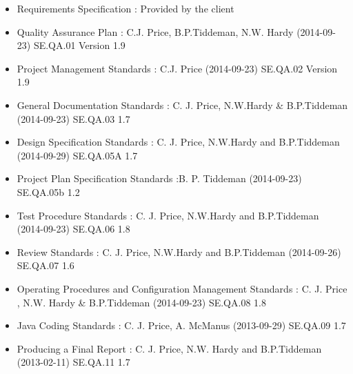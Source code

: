 \begin{itemize}
	\item Requirements Specification : Provided by the client
	\item Quality Assurance Plan : C.J. Price, B.P.Tiddeman, N.W. Hardy (2014-09-23) SE.QA.01 Version 1.9
	\item Project Management Standards : C.J. Price (2014-09-23) SE.QA.02 Version 1.9
	\item General Documentation Standards : C. J. Price, N.W.Hardy \& B.P.Tiddeman (2014-09-23) SE.QA.03 1.7
	\item Design Specification Standards : C. J. Price, N.W.Hardy and B.P.Tiddeman (2014-09-29) SE.QA.05A 1.7
	\item Project Plan Specification Standards :B. P. Tiddeman (2014-09-23) SE.QA.05b 1.2
	\item Test Procedure Standards : C. J. Price, N.W.Hardy and B.P.Tiddeman (2014-09-23) SE.QA.06 1.8
	\item Review Standards : C. J. Price, N.W.Hardy and B.P.Tiddeman (2014-09-26) SE.QA.07 1.6
	\item Operating Procedures and Configuration Management Standards : C. J. Price , N.W. Hardy \& B.P.Tiddeman (2014-09-23) SE.QA.08 1.8
	\item Java Coding Standards : C. J. Price, A. McManus (2013-09-29) SE.QA.09 1.7
	\item Producing a Final Report : C. J. Price, N.W. Hardy and B.P.Tiddeman (2013-02-11) SE.QA.11 1.7
\end{itemize}
